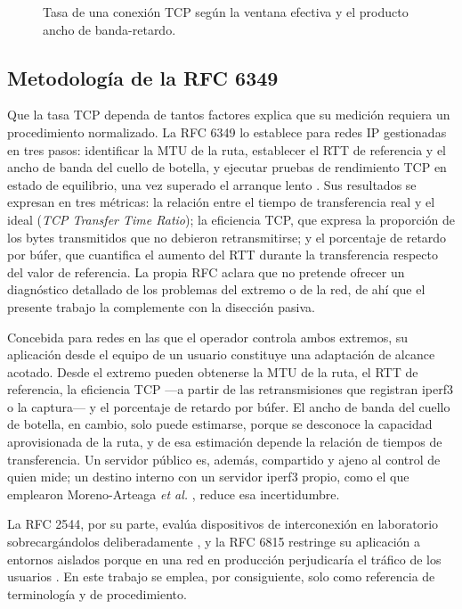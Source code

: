 \begin{figure}[htbp]
  \centering
  
  \caption{Tasa de una conexión TCP según la ventana efectiva y el producto ancho de banda-retardo.}
  \label{fig:ventana_bdp}
  \raggedright
\end{figure}

\subsection{Metodología de la RFC 6349}

Que la tasa TCP dependa de tantos factores explica que su medición requiera un procedimiento normalizado. La RFC 6349 lo establece para redes IP gestionadas en tres pasos: identificar la MTU de la ruta, establecer el RTT de referencia y el ancho de banda del cuello de botella, y ejecutar pruebas de rendimiento TCP en estado de equilibrio, una vez superado el arranque lento \cite{rfc6349}. Sus resultados se expresan en tres métricas: la relación entre el tiempo de transferencia real y el ideal (\textit{TCP Transfer Time Ratio}); la eficiencia TCP, que expresa la proporción de los bytes transmitidos que no debieron retransmitirse; y el porcentaje de retardo por búfer, que cuantifica el aumento del RTT durante la transferencia respecto del valor de referencia. La propia RFC aclara que no pretende ofrecer un diagnóstico detallado de los problemas del extremo o de la red, de ahí que el presente trabajo la complemente con la disección pasiva.

Concebida para redes en las que el operador controla ambos extremos, su aplicación desde el equipo de un usuario constituye una adaptación de alcance acotado. Desde el extremo pueden obtenerse la MTU de la ruta, el RTT de referencia, la eficiencia TCP ---a partir de las retransmisiones que registran iperf3 o la captura--- y el porcentaje de retardo por búfer. El ancho de banda del cuello de botella, en cambio, solo puede estimarse, porque se desconoce la capacidad aprovisionada de la ruta, y de esa estimación depende la relación de tiempos de transferencia. Un servidor público es, además, compartido y ajeno al control de quien mide; un destino interno con un servidor iperf3 propio, como el que emplearon Moreno-Arteaga \textit{et al.} \cite{moreno2023sitesurvey}, reduce esa incertidumbre.

La RFC 2544, por su parte, evalúa dispositivos de interconexión en laboratorio sobrecargándolos deliberadamente \cite{rfc2544}, y la RFC 6815 restringe su aplicación a entornos aislados porque en una red en producción perjudicaría el tráfico de los usuarios \cite{rfc6815}. En este trabajo se emplea, por consiguiente, solo como referencia de terminología y de procedimiento.


